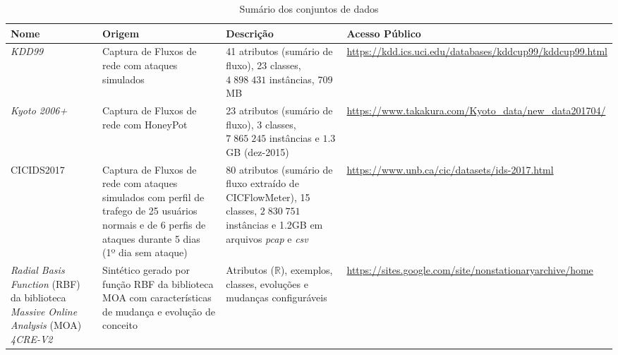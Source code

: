 \begin{table}[ht]
  \caption{Sumário dos conjuntos de dados}
  \centering
  \begin{scriptsize}
  \begin{tabularx}{\linewidth}{X|X|X|X}
    Nome &
      Origem &
      Descrição &
      Acesso Público \\
    \hline
    \hline
    \emph{KDD99} \cite{Tavallaee2009,Protic2018KddKyoto} &
      Captura de Fluxos de rede com ataques simulados &
      41 atributos (sumário de fluxo), 23 classes, $4\;898\;431$ instâncias, $709$ MB &
      \url{https://kdd.ics.uci.edu/databases/kddcup99/kddcup99.html} \\
    \hline
    \emph{Kyoto 2006+} \cite{Song2011kyoto,Protic2018KddKyoto}&
      Captura de Fluxos de rede com HoneyPot &
      23 atributos (sumário de fluxo), 3 classes, $7\;865\;245$ instâncias e $1.3$ GB (dez-2015) &
      \url{https://www.takakura.com/Kyoto_data/new_data201704/} \\

    
       \hline
    CICIDS2017 \cite{Sharafaldin2018cicids2017} &
      Captura de Fluxos de rede com ataques simulados com perfil de trafego de 25
      usuários normais e de 6 perfis de ataques durante 5 dias (1º dia sem ataque) &
      80 atributos (sumário de fluxo extraído de CICFlowMeter), 15 classes,
      $2\;830\;751$ instâncias e 1.2GB em arquivos \emph{pcap} e \emph{csv} &
      \url{https://www.unb.ca/cic/datasets/ids-2017.html} \\
    \hline
    \emph{Radial Basis Function} (RBF) da biblioteca \emph{Massive Online Analysis} (MOA)
    \emph{4CRE-V2} &
      Sintético gerado por função RBF da biblioteca MOA com características de
      mudança e evolução de conceito &
      Atributos ($\mathbb{R}$), exemplos, classes, evoluções e mudanças configuráveis &
      \url{https://sites.google.com/site/nonstationaryarchive/home} \\
    \hline
  \end{tabularx}
  \label{tab:summary-dataset}
  \end{scriptsize}
\end{table}

